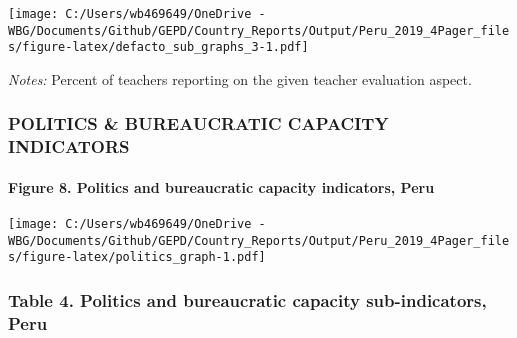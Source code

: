 \documentclass[twocolumn]{article}
\let\oldparagraph\paragraph
\renewcommand{\paragraph}[1]{\oldparagraph{#1}\mbox{}}
\begin{document}
\texttt{[image: C:/Users/wb469649/OneDrive - WBG/Documents/Github/GEPD/Country\_Reports/Output/Peru\_2019\_4Pager\_files/figure-latex/defacto\_sub\_graphs\_3-1.pdf]}

\color{darkgray}\scriptsize{\textit{Notes:} Percent of teachers reporting on the given teacher evaluation aspect.}

\vfill\null

\hypertarget{politics-bureaucratic-capacity-indicators}{%
\subsubsection{\texorpdfstring{\textbf{POLITICS \& BUREAUCRATIC CAPACITY
INDICATORS}}{POLITICS \& BUREAUCRATIC CAPACITY INDICATORS}}\label{politics-bureaucratic-capacity-indicators}}


\hypertarget{figure-8.-politics-and-bureaucratic-capacity-indicators-peru}{%
\paragraph{Figure 8. Politics and bureaucratic capacity indicators,
Peru}\label{figure-8.-politics-and-bureaucratic-capacity-indicators-peru}}

\texttt{[image: C:/Users/wb469649/OneDrive - WBG/Documents/Github/GEPD/Country\_Reports/Output/Peru\_2019\_4Pager\_files/figure-latex/politics\_graph-1.pdf]}

\hypertarget{table-4.-politics-and-bureaucratic-capacity-sub-indicators-peru}{%
\subsubsection{Table 4. Politics and bureaucratic capacity
sub-indicators,
Peru}\label{table-4.-politics-and-bureaucratic-capacity-sub-indicators-peru}}
\end{document}
